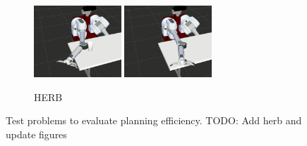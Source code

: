 \documentclass[letterpaper, 10 pt, conference]{ieeeconf}  %
\begin{document}
\begin{figure}[t!]
\begin{subfigure}[b]{\textwidth}
    \includegraphics[height=2.7cm]{fig/planning_efficiency/herb_batting_4}
    \includegraphics[height=2.7cm]{fig/planning_efficiency/herb_batting_5}
	\caption{HERB}
	\label{fig:planning_efficiency:herb:example}
	\end{subfigure}
	\caption{Test problems to evaluate planning efficiency. TODO: Add herb and update figures}
	\label{fig:problems}
\end{figure} 
\end{document}
